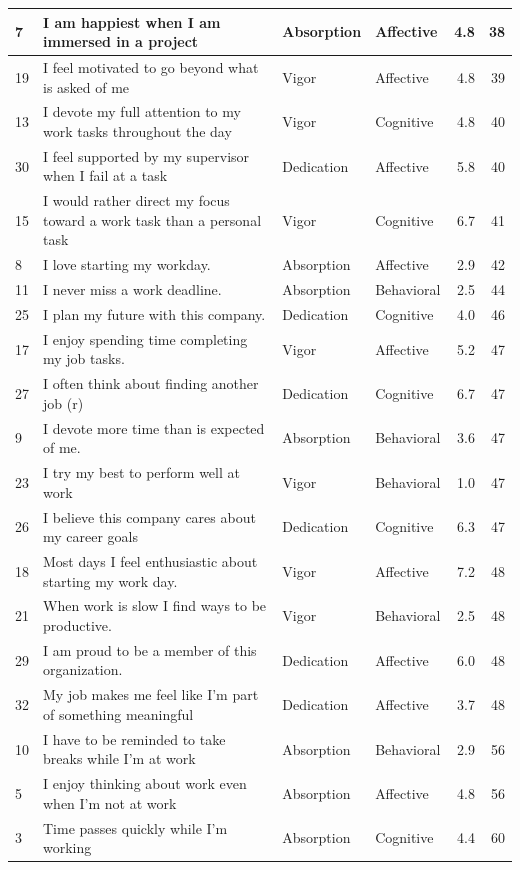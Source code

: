 \documentclass[
]{book}
\begin{document}
\begin{table}
\begin{tabular}[t]{l|l|l|l|r|r}
\hline
7 & I am happiest when I am immersed in a project & Absorption & Affective & 4.8 & 38\\
\hline
19 & I feel motivated to go beyond what is asked of me & Vigor & Affective & 4.8 & 39\\
\hline
13 & I devote my full attention to my work tasks throughout the day & Vigor & Cognitive & 4.8 & 40\\
\hline
30 & I feel supported by my supervisor when I fail at a task & Dedication & Affective & 5.8 & 40\\
\hline
15 & I would rather direct my focus toward a work task than a personal task & Vigor & Cognitive & 6.7 & 41\\
\hline
8 & I love starting my workday. & Absorption & Affective & 2.9 & 42\\
\hline
11 & I never miss a work deadline. & Absorption & Behavioral & 2.5 & 44\\
\hline
25 & I plan my future with this company. & Dedication & Cognitive & 4.0 & 46\\
\hline
17 & I enjoy spending time completing my job tasks. & Vigor & Affective & 5.2 & 47\\
\hline
27 & I often think about finding another job (r) & Dedication & Cognitive & 6.7 & 47\\
\hline
9 & I devote more time than is expected of me. & Absorption & Behavioral & 3.6 & 47\\
\hline
23 & I try my best to perform well at work & Vigor & Behavioral & 1.0 & 47\\
\hline
26 & I believe this company cares about my career goals & Dedication & Cognitive & 6.3 & 47\\
\hline
18 & Most days I feel enthusiastic about starting my work day. & Vigor & Affective & 7.2 & 48\\
\hline
21 & When work is slow I find ways to be productive. & Vigor & Behavioral & 2.5 & 48\\
\hline
29 & I am proud to be a member of this organization. & Dedication & Affective & 6.0 & 48\\
\hline
32 & My job makes me feel like I’m part of something meaningful & Dedication & Affective & 3.7 & 48\\
\hline
10 & I have to be reminded to take breaks while I’m at work & Absorption & Behavioral & 2.9 & 56\\
\hline
5 & I enjoy thinking about work even when I’m not at work & Absorption & Affective & 4.8 & 56\\
\hline
3 & Time passes quickly while I’m working & Absorption & Cognitive & 4.4 & 60\\
\hline
\end{tabular}
\end{table}

  
\end{document}
